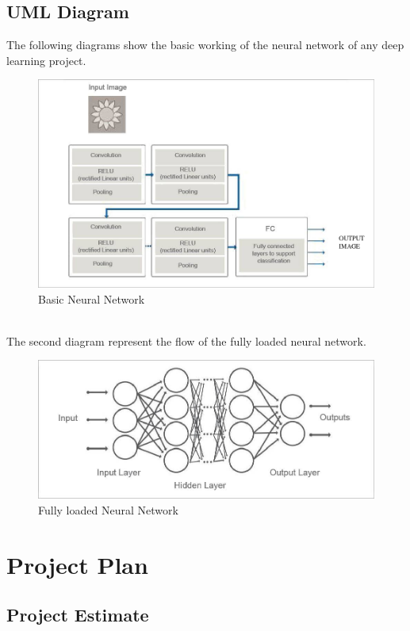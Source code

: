 \documentclass[oneside,a4paper,12pt]{report}
\begin{document}
\section{UML Diagram}
The following diagrams show the basic working of the neural network of any deep learning project.\\
\begin{figure}
    \centering
    \includegraphics[width=\textwidth]{Neural-network-data-training-approach.png}
    \caption{Basic Neural Network }
    \label{fig:my_label}
\end{figure}
\\
The second diagram represent the flow of the fully loaded neural network.
\begin{figure}
    \centering
    \includegraphics[width=\textwidth]{Deep-learning-neural-networks.jpg}
    \caption{Fully loaded Neural Network}
    \label{fig:my_label}
\end{figure}

\chapter{Project Plan}

\section{Project Estimate}
\end{document}

